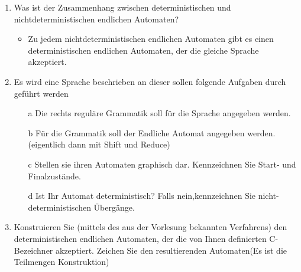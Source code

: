 \begin{enumerate}
\begin{itemize}
  \end{itemize}
  \item Was ist der Zusammenhang zwischen deterministischen und nichtdeterministischen endlichen Automaten?
  \begin{itemize}
    \item Zu jedem nichtdeterministischen endlichen Automaten gibt es einen deterministischen endlichen Automaten, der die gleiche Sprache akzeptiert.
  \end{itemize}
  \item  Es wird eine Sprache beschrieben an dieser sollen folgende Aufgaben durch geführt werden
  \begin{itemize}
    \item [a] Die rechts reguläre Grammatik soll für die Sprache angegeben werden.
    \item [b] Für die Grammatik soll der Endliche Automat angegeben werden. (eigentlich dann mit Shift und Reduce)
    \item [c] Stellen sie ihren Automaten graphisch dar. Kennzeichnen Sie Start- und Finalzustände.
    \item [d] Ist Ihr Automat deterministisch? Falls nein,kennzeichnen Sie nicht-deterministischen Übergänge.
  \end{itemize}
  \item Konstruieren Sie (mittels des aus der Vorlesung bekannten Verfahrens) den deterministischen
  endlichen Automaten, der die von Ihnen definierten C-Bezeichner akzeptiert. Zeichen Sie den resultierenden
  Automaten(Es ist die Teilmengen Konstruktion)
\end{enumerate}

